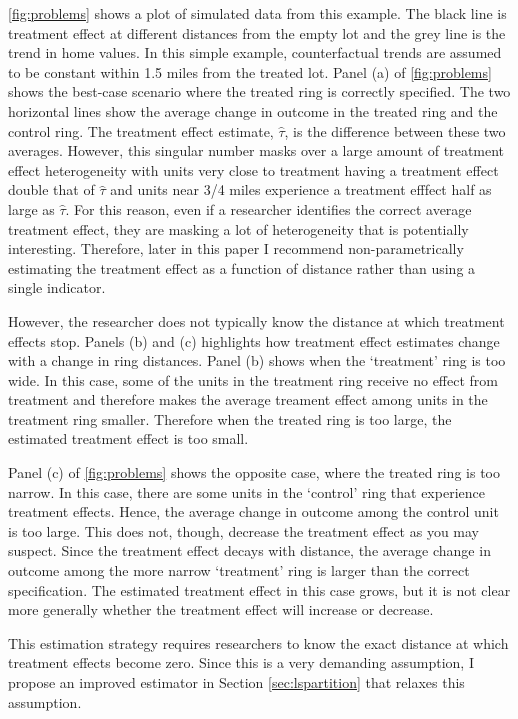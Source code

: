 \documentclass[10pt]{article}
\begin{document}
\autoref{fig:problems} shows a plot of simulated data from this example. The black line is treatment effect at different distances from the empty lot and the grey line is the trend in home values. In this simple example, counterfactual trends are assumed to be constant within 1.5 miles from the treated lot. Panel (a) of \autoref{fig:problems} shows the best-case scenario where the treated ring is correctly specified. The two horizontal lines show the average change in outcome in the treated ring and the control ring. The treatment effect estimate, $\hat{\tau}$, is the difference between these two averages. However, this singular number masks over a large amount of treatment effect heterogeneity with units very close to treatment having a treatment effect double that of $\hat{\tau}$ and units near 3/4 miles experience a treatment efffect half as large as $\hat{\tau}$. For this reason, even if a researcher identifies the correct average treatment effect, they are masking a lot of heterogeneity that is potentially interesting. Therefore, later in this paper I recommend non-parametrically estimating the treatment effect as a function of distance rather than using a single indicator. 

However, the researcher does not typically know the distance at which treatment effects stop. Panels (b) and (c) highlights how treatment effect estimates change with a change in ring distances. Panel (b) shows when the `treatment' ring is too wide. In this case, some of the units in the treatment ring receive no effect from treatment and therefore makes the average treament effect among units in the treatment ring smaller. Therefore when the treated ring is too large, the estimated treatment effect is too small.

Panel (c) of \autoref{fig:problems} shows the opposite case, where the treated ring is too narrow. In this case, there are some units in the `control' ring that experience treatment effects. Hence, the average change in outcome among the control unit is too large. This does not, though, decrease the treatment effect as you may suspect. Since the treatment effect decays with distance, the average change in outcome among the more narrow `treatment' ring is larger than the correct specification. The estimated treatment effect in this case grows, but it is not clear more generally whether the treatment effect will increase or decrease. 

This estimation strategy requires researchers to know the exact distance at which treatment effects become zero. Since this is a very demanding assumption, I propose an improved estimator in Section \ref{sec:lspartition} that relaxes this assumption. 
\end{document}
